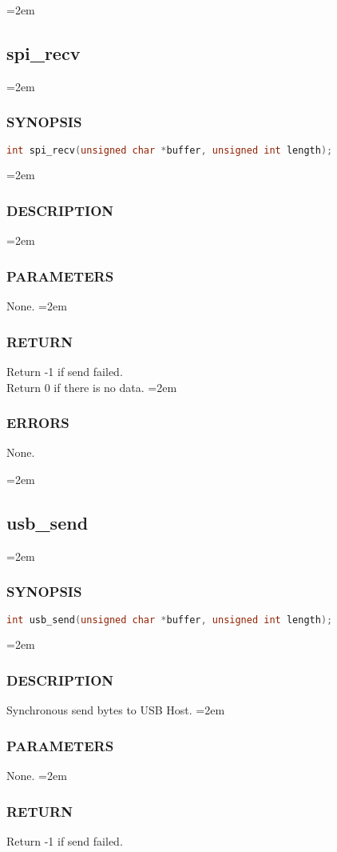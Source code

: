 \documentclass[a4paper]{article}
\let\oldsubsection\subsection
\renewcommand{\subsection}{\leftskip=2em \oldsubsection}
\let\oldsubsubsection\subsubsection
\renewcommand{\subsubsection}{\leftskip=2em \oldsubsubsection}
\begin{document}
\subsection{spi\_recv}
\subsubsection{SYNOPSIS}
\begin{lstlisting}[language=C]
int spi_recv(unsigned char *buffer, unsigned int length);
\end{lstlisting}
\subsubsection{DESCRIPTION}
\subsubsection{PARAMETERS}
None.
\subsubsection{RETURN}
Return -1 if send failed.\\
Return 0 if there is no data.
\subsubsection{ERRORS}
None.

\subsection{usb\_send}
\subsubsection{SYNOPSIS}
\begin{lstlisting}[language=C]
int usb_send(unsigned char *buffer, unsigned int length);
\end{lstlisting}
\subsubsection{DESCRIPTION}
Synchronous send bytes to USB Host.
\subsubsection{PARAMETERS}
None.
\subsubsection{RETURN}
Return -1 if send failed.
\end{document}
